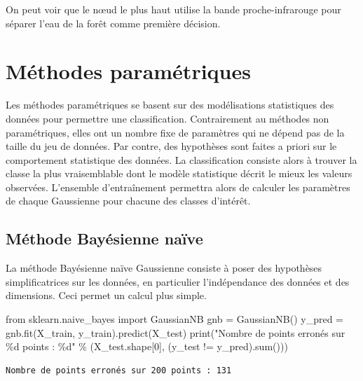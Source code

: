 \documentclass[
  11pt,
  letterpaper,
  open=any,
  twoside=false,
  french]{scrbook}
\newenvironment{Shaded}{\begin{snugshade}}{\end{snugshade}}
\newcommand{\BuiltInTok}[1]{\textcolor[rgb]{0.00,0.23,0.31}{#1}}
\newcommand{\DecValTok}[1]{\textcolor[rgb]{0.68,0.00,0.00}{#1}}
\newcommand{\ImportTok}[1]{\textcolor[rgb]{0.00,0.46,0.62}{#1}}
\newcommand{\NormalTok}[1]{\textcolor[rgb]{0.00,0.23,0.31}{#1}}
\newcommand{\OperatorTok}[1]{\textcolor[rgb]{0.37,0.37,0.37}{#1}}
\newcommand{\SpecialCharTok}[1]{\textcolor[rgb]{0.37,0.37,0.37}{#1}}
\newcommand{\StringTok}[1]{\textcolor[rgb]{0.13,0.47,0.30}{#1}}
\begin{document}
On peut voir que le nœud le plus haut utilise la bande proche-infrarouge
pour séparer l'eau de la forêt comme première décision.

\section{Méthodes paramétriques}\label{muxe9thodes-paramuxe9triques}

Les méthodes paramétriques se basent sur des modélisations statistiques
des données pour permettre une classification. Contrairement au méthodes
non paramétriques, elles ont un nombre fixe de paramètres qui ne dépend
pas de la taille du jeu de données. Par contre, des hypothèses sont
faites a priori sur le comportement statistique des données. La
classification consiste alors à trouver la classe la plus vraisemblable
dont le modèle statistique décrit le mieux les valeurs observées.
L'ensemble d'entraînement permettra alors de calculer les paramètres de
chaque Gaussienne pour chacune des classes d'intérêt.

\subsection{Méthode Bayésienne
naïve}\label{muxe9thode-bayuxe9sienne-nauxefve}

La méthode Bayésienne naïve Gaussienne consiste à poser des hypothèses
simplificatrices sur les données, en particulier l'indépendance des
données et des dimensions. Ceci permet un calcul plus simple.

\begin{Shaded}
\begin{Highlighting}[]
\ImportTok{from}\NormalTok{ sklearn.naive\_bayes }\ImportTok{import}\NormalTok{ GaussianNB}
\NormalTok{gnb }\OperatorTok{=}\NormalTok{ GaussianNB()}
\NormalTok{y\_pred }\OperatorTok{=}\NormalTok{ gnb.fit(X\_train, y\_train).predict(X\_test)}
\BuiltInTok{print}\NormalTok{(}\StringTok{"Nombre de points erronés sur }\SpecialCharTok{\%d}\StringTok{ points : }\SpecialCharTok{\%d}\StringTok{"}
      \OperatorTok{\%}\NormalTok{ (X\_test.shape[}\DecValTok{0}\NormalTok{], (y\_test }\OperatorTok{!=}\NormalTok{ y\_pred).}\BuiltInTok{sum}\NormalTok{()))}
\end{Highlighting}
\end{Shaded}

\begin{verbatim}
Nombre de points erronés sur 200 points : 131
\end{verbatim}
\end{document}
